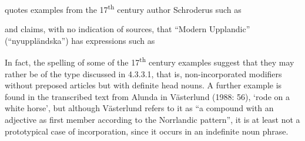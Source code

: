 
\citet[523]{Hesselman1908} quotes examples from the 17\textsuperscript{th} century author Schroderus such as


\ea\label{}


\z 
\z 

and claims, with no indication of sources, that “Modern Upplandic” (“nyupp\-ländska”) has expressions such as


\ea\label{}

\z 
\z 

In fact, the spelling of some of the 17\textsuperscript{th} century examples suggest that they may rather be of the type discussed in 4.3.3.1, that is, non-incorporated modifiers without preposed articles but with definite head nouns. A further example is found in the transcribed text from Alunda in Västerlund (1988: 56),  ‘rode on a white horse’, but although Västerlund refers to it as “a compound with an adjective as first member according to the Norrlandic pattern”, it is at least not a prototypical case of incorporation, since it occurs in an indefinite noun phrase.

